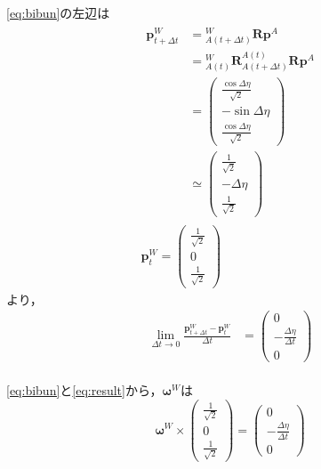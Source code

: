 \autoref{eq:bibun}の左辺は
\begin{gather}
  \begin{align}
    \boldsymbol{p}^{W}_{t+ \Delta t} &= {}^{W}_{A(t+ \Delta t)}\boldsymbol{R}\boldsymbol{p}^{A}\\
    &= {}^{W}_{A(t)}\boldsymbol{R}{}^{A(t)}_{A(t+ \Delta t)}\boldsymbol{R}\boldsymbol{p}^{A}\\
    &= \begin{pmatrix}
      \frac{\cos \Delta \eta}{\sqrt{2}}\\
      - \sin \Delta \eta\\
      \frac{\cos \Delta \eta}{\sqrt{2}}
    \end{pmatrix}\\
    &\simeq \begin{pmatrix}
      \frac{1}{\sqrt{2}}\\
      - \Delta \eta\\
      \frac{1}{\sqrt{2}}
    \end{pmatrix}
  \end{align}\\
  \boldsymbol{p}^{W}_{t} = \begin{pmatrix}
    \frac{1}{\sqrt{2}}\\
    0\\
    \frac{1}{\sqrt{2}}
  \end{pmatrix}
\end{gather}
より，
\begin{align}
  \lim_{\Delta t \to 0} \frac{\boldsymbol{p}^{W}_{t+ \Delta t} - \boldsymbol{p}^{W}_{t}}{\Delta t} &= \begin{pmatrix}
    0\\
    -\frac{\Delta \eta}{\Delta t}\\
    0
  \end{pmatrix}
\end{align}\\
\autoref{eq:bibun}と\autoref{eq:result}から，$\boldsymbol{\omega}^{W}$は
\begin{equation}
  \boldsymbol{\omega}^{W} \times \begin{pmatrix}
    \frac{1}{\sqrt{2}}\\
    0\\
    \frac{1}{\sqrt{2}}
  \end{pmatrix} = \begin{pmatrix}
    0\\
    -\frac{\Delta \eta}{\Delta t}\\
    0
  \end{pmatrix}\label{eq:target}
\end{equation}
